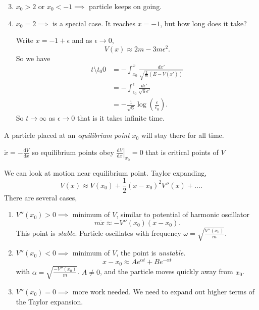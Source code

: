 \begin{enumerate}
    \setcounter{enumi}{2}
    \item \(x_0 > 2 \text{ or } x_0 < -1 \implies \) particle keeps on going.
    \item \(x_0 = 2 \implies\) is a special case. It reaches \(x = -1\), but how long does it take?
    
    Write \(x = -1 + \epsilon\) and as \(\epsilon \to 0\),
    \[
        V(x) \approx 2m - 3m \epsilon^2.
    \]
    So we have
    \begin{align*}
        t \setminus  t_0 0&= - \int_{x_0}^x \frac{dx'}{\sqrt{\frac{2}{m}(E-V(x'))} }\\
        &=-\int_{\epsilon_0}^\epsilon \frac{d\epsilon'}{\sqrt{6}\epsilon'}\\
        &= -\frac{1}{\sqrt{6} }\log (\frac{\epsilon}{\epsilon_0}).
    \end{align*}
    So \(t \to \infty\) as \(\epsilon \to 0\) that is it takes infinite time.
\end{enumerate}
\begin{definition}{}{}
    A particle placed at an \textit{equilibrium point} \(x_0\) will stay there for all time.

    \(\ddot{x}=-\frac{\mathrm{d}V}{\mathrm{d}x}\) so equilibrium points obey \(\left.\frac{\mathrm{d}V}{\mathrm{d}x} \right|_{x_0} = 0\) that is critical points of \(V\)
\end{definition}

We can look at motion near equilibrium point. Taylor expanding,
\[
    V(x) \approx V(x_0) + \frac{1}{2}(x-x_0)^{2}V''(x) + \ldots.
\]
There are several cases,
\begin{enumerate}
    \item \(V''(x_0) > 0 \implies \) minimum of \(V\), similar to potential of harmonic oscillator
    \[
        m\ddot{x} \approx -V''(x_0)(x-x_0).
    \]
    This point is \textit{stable}. Particle oscillates with frequency \(\omega = \sqrt{\frac{V''(x_0)}{m}} \).
    \item \(V''(x_0) < 0 \implies \) minimum of \(V\), the point is \textit{unstable}.
    \[
    x - x_0 \approx Ae^{\alpha t} + B e^{-\alpha t}
    \]
    with \(\alpha = \sqrt{\frac{-V''(x_0)}{m}} \).
    \(A \neq 0\), and the particle moves quickly away from \(x_0\).
    \item \(V''(x_0) = 0\implies\) more work needed. We need to expand out higher terms of the Taylor expansion.
\end{enumerate}

